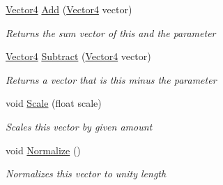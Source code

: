 \begin{DoxyCompactItemize}
\item 
\hyperlink{struct_engine_1_1_vector4}{Vector4} \hyperlink{struct_engine_1_1_vector4_a51f583a5b4c526dffc2a6aaaaa42f4de}{Add} (\hyperlink{struct_engine_1_1_vector4}{Vector4} vector)
\begin{DoxyCompactList}\small\item\em Returns the sum vector of this and the parameter \end{DoxyCompactList}\item 
\hyperlink{struct_engine_1_1_vector4}{Vector4} \hyperlink{struct_engine_1_1_vector4_a641d305fb99cdc68594281226edde04c}{Subtract} (\hyperlink{struct_engine_1_1_vector4}{Vector4} vector)
\begin{DoxyCompactList}\small\item\em Returns a vector that is this minus the parameter \end{DoxyCompactList}\item 
void \hyperlink{struct_engine_1_1_vector4_a7c9051137b9f281524babaa579205346}{Scale} (float scale)
\begin{DoxyCompactList}\small\item\em Scales this vector by given amount \end{DoxyCompactList}\item 
void \hyperlink{struct_engine_1_1_vector4_a2f216890a69d030ee83a169849e40356}{Normalize} ()
\begin{DoxyCompactList}\small\item\em Normalizes this vector to unity length \end{DoxyCompactList}\end{DoxyCompactItemize}

